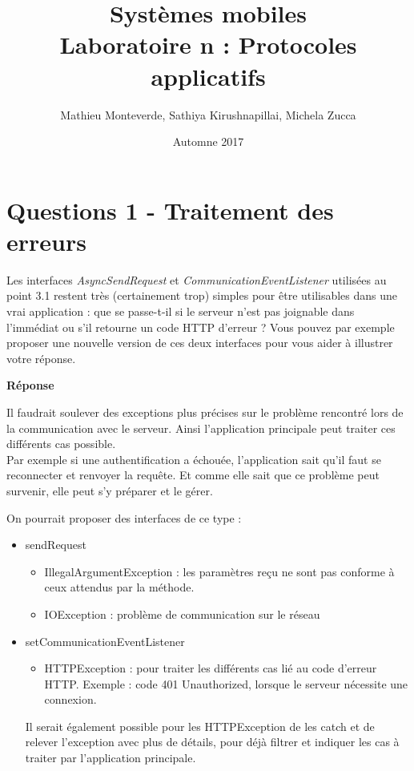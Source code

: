 \documentclass[francais,12pt]{article}
\title{Systèmes mobiles \\ Laboratoire n\textordmasculine2 : Protocoles applicatifs}
\author{Mathieu Monteverde, Sathiya Kirushnapillai, Michela Zucca}
\date{Automne 2017}
\begin{document}
	
	\maketitle
	
	\setlength{\parskip}{1em}
	
	\section*{Questions 1 - Traitement des erreurs}
	
	Les interfaces \textit{AsyncSendRequest} et \textit{CommunicationEventListener} utilisées au point 3.1 restent très (certainement trop) simples pour être utilisables dans une vrai application : que se passe-t-il si le serveur n'est pas joignable dans l'immédiat ou s'il retourne un code HTTP d'erreur ? Vous pouvez par exemple proposer une nouvelle version de ces deux interfaces pour vous aider à illustrer votre réponse.
	
	{\color[rgb]{0,0.5,0.23}\textbf{Réponse}}
	
	Il faudrait soulever des exceptions plus précises sur le problème rencontré lors de la communication avec le serveur. Ainsi l'application principale peut traiter ces différents cas possible. \\
	Par exemple si une authentification a échouée, l'application sait qu'il faut se reconnecter et renvoyer la requête. Et comme elle sait que ce problème peut survenir, elle peut s'y préparer et le gérer. 
	
	On pourrait proposer des interfaces de ce type : 
	\begin{itemize}
		\item sendRequest
		\begin{itemize}
			\item IllegalArgumentException : les paramètres reçu ne sont pas conforme à ceux attendus par la méthode.
			\item IOException : problème de communication sur le réseau
		\end{itemize}
		\item setCommunicationEventListener
		\begin{itemize}
			\item HTTPException : pour traiter les différents cas lié au code d'erreur HTTP. Exemple : code 401 Unauthorized, lorsque le serveur nécessite une connexion.
		\end{itemize}
	
	Il serait également possible pour les HTTPException de les catch et de relever l'exception avec plus de détails, pour déjà filtrer et indiquer les cas à traiter par l'application principale.
		
	\end{itemize}
	
\end{document}

